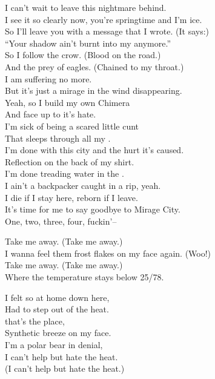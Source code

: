 
I can't wait to leave this nightmare behind. \\
I see it so clearly now, you're springtime and I'm ice. \\
So I'll leave you with a message that I wrote. (It says:) \\
``Your shadow ain't burnt into my  anymore.'' \\

So I follow the crow. (Blood on the road.) \\
And the prey of eagles. (Chained to my throat.) \\
I am suffering no more. \\
But it's just a mirage in the wind disappearing. \\

Yeah, so I build my own Chimera \\
And face up to it's hate. \\
I'm sick of being a scared little cunt \\
That sleeps through all my . \\
I'm done with this city and the hurt it's caused. \\

Reflection on the back of my shirt. \\
I'm done treading water in the . \\
I ain't a backpacker caught in a rip, yeah. \\
I die if I stay here, reborn if I leave. \\
It's time for me to say goodbye to Mirage City. \\

One, two, three, four, fuckin'--




Take me away. (Take me away.) \\
I wanna feel them frost flakes on my face again. (Woo!) \\
Take me away. (Take me away.) \\
Where the temperature stays below 25/78. \\


I felt so at home down here, \\
Had to step out of the heat. \\
 that's the place, \\
Synthetic breeze on my face. \\
I'm a polar bear in denial, \\
I can't help but hate the heat. \\
(I can't help but hate the heat.) \\


